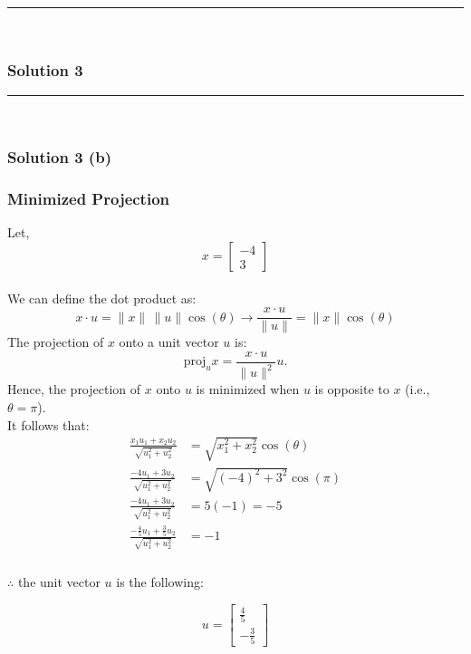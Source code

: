 \documentclass{article}
\begin{document}
\noindent\rule{\textwidth}{0.4pt}\\

\newpage

\subsubsection*{Solution 3}
\noindent\rule{\textwidth}{0.4pt}\\
\subsubsection*{Solution 3 (b)}
\subsubsection*{Minimized Projection}
Let, \\
$$x = \begin{bmatrix}-4 \\ 3\end{bmatrix}$$ \\
We can define the dot product as:
$$x \cdot u = \|x\|\,\|u\|\cos(\theta) \rightarrow \frac{x \cdot u}{\|u\|} = \|x\|\cos(\theta)$$
The projection of $x$ onto a unit vector $u$ is:
$$\text{proj}_u x = \frac{x \cdot u}{\|u\|^2} u.$$
Hence, the projection of $x$ onto $u$ is minimized when $u$ is opposite to $x$ (i.e., $\theta=\pi$). \\
It follows that:
\begin{align*}
    \frac{x_1u_1 + x_2u_2}{\sqrt{u_{1}^{2}+u_{2}^{2}}} &= \sqrt{x_{1}^{2}+x_{2}^{2}}\cos(\theta) \\
    \frac{-4u_1 + 3u_2}{\sqrt{u_{1}^{2}+u_{2}^{2}}} &= \sqrt{(-4)^{2}+3^{2}}\cos(\pi) \\
    \frac{-4u_1 + 3u_2}{\sqrt{u_{1}^{2}+u_{2}^{2}}} &= 5(-1) = -5 \\
    \frac{-\frac{4}{5}u_1 + \frac{3}{5}u_2}{\sqrt{u_{1}^{2}+u_{2}^{2}}} &= -1
\end{align*}

\subsubsection*{\normalfont}{$\therefore$ the unit vector $u$ is the following:}

$$u = \begin{bmatrix} \frac{4}{5} \\[2pt] -\frac{3}{5} \end{bmatrix}$$
\end{document}
